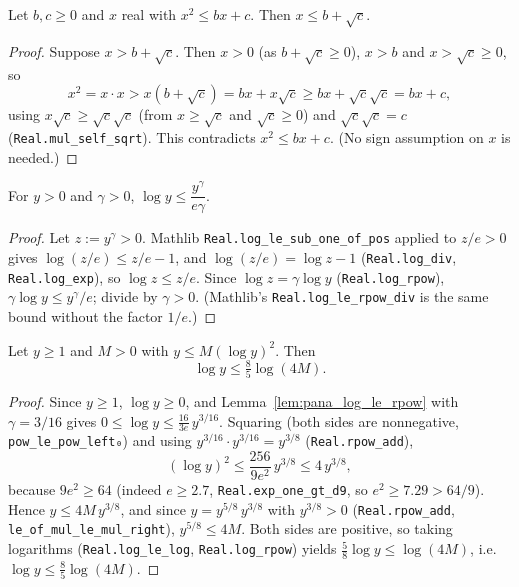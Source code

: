 \begin{lemma}\label{lem:pana_quadratic_root}
\leanok
Let $b, c \ge 0$ and $x$ real with $x^2 \le bx + c$. Then $x \le b + \sqrt c$.
\end{lemma}

\begin{proof}
\leanok
Suppose $x > b + \sqrt c$. Then $x > 0$ (as $b + \sqrt c \ge 0$), $x > b$ and $x > \sqrt c \ge 0$,
so
\[
  x^2 = x\cdot x > x(b + \sqrt c) = bx + x\sqrt c \ge bx + \sqrt c\sqrt c = bx + c ,
\]
using $x\sqrt c \ge \sqrt c\sqrt c$ (from $x \ge \sqrt c$ and $\sqrt c \ge 0$) and
$\sqrt c\sqrt c = c$ (\texttt{Real.mul\_self\_sqrt}). This contradicts $x^2 \le bx + c$.
(No sign assumption on $x$ is needed.)
\end{proof}

\begin{lemma}\label{lem:pana_log_le_rpow}
\leanok
For $y > 0$ and $\gamma > 0$, $\log y \le \dfrac{y^{\gamma}}{e\gamma}$.
\end{lemma}

\begin{proof}
\leanok
Let $z := y^\gamma > 0$. Mathlib \texttt{Real.log\_le\_sub\_one\_of\_pos} applied to $z/e > 0$
gives $\log(z/e) \le z/e - 1$, and $\log(z/e) = \log z - 1$ (\texttt{Real.log\_div},
\texttt{Real.log\_exp}), so $\log z \le z/e$. Since $\log z = \gamma\log y$
(\texttt{Real.log\_rpow}), $\gamma\log y \le y^\gamma/e$; divide by $\gamma > 0$.
(Mathlib's \texttt{Real.log\_le\_rpow\_div} is the same bound without the factor $1/e$.)
\end{proof}

\begin{lemma}\label{lem:pana_log_self_bound}
\leanok
Let $y \ge 1$ and $M > 0$ with $y \le M(\log y)^2$. Then
\[
  \log y \le \tfrac85\log(4M) .
\]
\end{lemma}

\begin{proof}
\leanok
Since $y \ge 1$, $\log y \ge 0$, and Lemma~\ref{lem:pana_log_le_rpow} with $\gamma = 3/16$ gives
$0 \le \log y \le \frac{16}{3e}\,y^{3/16}$. Squaring (both sides are nonnegative,
\texttt{pow\_le\_pow\_left₀}) and using $y^{3/16}\cdot y^{3/16} = y^{3/8}$ (\texttt{Real.rpow\_add}),
\[
  (\log y)^2 \le \frac{256}{9e^2}\,y^{3/8} \le 4\,y^{3/8},
\]
because $9e^2 \ge 64$ (indeed $e \ge 2.7$, \texttt{Real.exp\_one\_gt\_d9}, so $e^2 \ge 7.29 > 64/9$).
Hence $y \le 4M\,y^{3/8}$, and since $y = y^{5/8}\,y^{3/8}$ with $y^{3/8} > 0$
(\texttt{Real.rpow\_add}, \texttt{le\_of\_mul\_le\_mul\_right}), $y^{5/8} \le 4M$. Both sides are
positive, so taking logarithms (\texttt{Real.log\_le\_log}, \texttt{Real.log\_rpow}) yields
$\frac58\log y \le \log(4M)$, i.e.\ $\log y \le \frac85\log(4M)$.
\end{proof}

